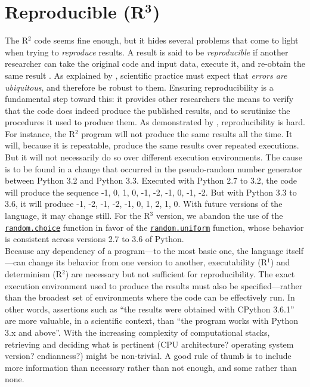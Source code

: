 \documentclass[a4paper,11pt]{article}
\begin{document}
\section*{Reproducible (R$^{\mathbf 3}$)}

The R$^2$ code seems fine enough, but it hides several problems that come to light when trying to {\em reproduce} results. A result is said to be \emph{reproducible} if another researcher can take the original code and input data, execute it, and re-obtain the same result \parencite{Peng:2006}. As explained by \citeauthor{Donoho:2009} \parencite{Donoho:2009}, scientific practice must expect that {\em errors are ubiquitous}, and therefore be robust to them. Ensuring reproducibility is a fundamental step toward this: it provides other researchers the means to verify that the code does indeed produce the published results, and to scrutinize the procedures it used to produce them. As demonstrated by \citeauthor{Mesnard:2016} \citep{Mesnard:2016}, reproducibility is hard.\\

For instance, the R$^2$ program will not produce the same results all the time. It will, because it is repeatable, produce the same results over repeated executions. But it will not necessarily do so over different execution environments. The cause is to be found in a change that occurred in the pseudo-random number generator between Python 3.2 and Python 3.3. Executed with Python 2.7 to 3.2, the code will produce the sequence -1, 0, 1, 0, -1, -2, -1, 0, -1, -2. But with Python 3.3 to 3.6, it will produce -1, -2, -1, -2, -1, 0, 1, 2, 1, 0. With future versions of the language, it may change still. For the R$^3$ version, we abandon the use of the {\tt \href{https://docs.python.org/3.6/library/random.html#random.choice}{random.choice}} function in favor of the {\tt \href{https://docs.python.org/3.6/library/random.html#random.uniform}{random.uniform}} function, whose behavior is consistent across versions 2.7 to 3.6 of Python.\\

Because any dependency of a program---to the most basic one, the language itself---can change its behavior from one version to another, executability (R$^1$) and determinism (R$^2$) are necessary but not sufficient for reproducibility. The exact execution environment used to produce the results must also be specified---rather than the broadest set of environments where the code can be effectively run. In other words, assertions such as \enquote{the results were obtained with CPython 3.6.1} are more valuable, in a scientific context, than \enquote{the program works with Python 3.x and above}. With the increasing complexity of computational stacks, retrieving and deciding what is pertinent (CPU architecture? operating system version? endianness?) might be non-trivial. A good rule of thumb is to include more information than necessary rather than not enough, and some rather than none.\\
\end{document}
